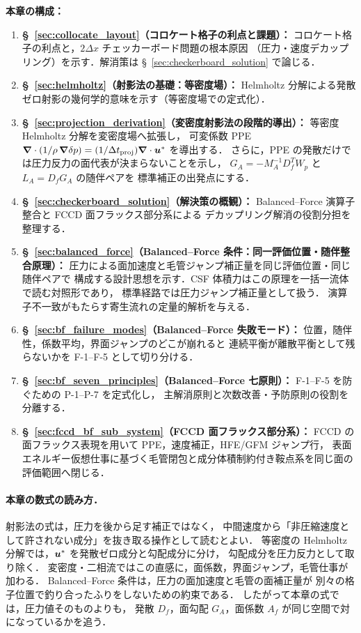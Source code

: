 \noindent\textbf{本章の構成：}
\begin{enumerate}
  \item \textbf{§~\ref{sec:collocate_layout}（コロケート格子の利点と課題）：}
        コロケート格子の利点と，$2\Delta x$ チェッカーボード問題の根本原因
        （圧力・速度デカップリング）を示す．解消策は §~\ref{sec:checkerboard_solution} で論じる．
  \item \textbf{§~\ref{sec:helmholtz}（射影法の基礎：等密度場）：}
        Helmholtz 分解による発散ゼロ射影の幾何学的意味を示す（等密度場での定式化）．
  \item \textbf{§~\ref{sec:projection_derivation}（変密度射影法の段階的導出）：}
        等密度 Helmholtz 分解を変密度場へ拡張し，
        可変係数 PPE
        $\bm{\nabla}\cdot(1/\rho\,\bm{\nabla}\delta p)
        = (1/\Delta t_{\mathrm{proj}})\bm{\nabla}\cdot\bm{u}^*$ を導出する．
        さらに，PPE の発散だけでは圧力反力の面代表が決まらないことを示し，
        $G_A=-M_A^{-1}D_f^TW_p$ と $L_A=D_fG_A$ の随伴ペアを
        標準補正の出発点にする．
  \item \textbf{§~\ref{sec:checkerboard_solution}（解決策の概観）：}
        Balanced--Force 演算子整合と FCCD 面フラックス部分系による
        デカップリング解消の役割分担を整理する．
  \item \textbf{§~\ref{sec:balanced_force}（Balanced--Force 条件：同一評価位置・随伴整合原理）：}
        圧力による面加速度と毛管ジャンプ補正量を同じ評価位置・同じ随伴ペアで
        構成する設計思想を示す．CSF 体積力はこの原理を一括一流体で読む対照形であり，
        標準経路では圧力ジャンプ補正量として扱う．
        演算子不一致がもたらす寄生流れの定量的解析を与える．
  \item \textbf{§~\ref{sec:bf_failure_modes}（Balanced--Force 失敗モード）：}
        位置，随伴性，係数平均，界面ジャンプのどこが崩れると
        連続平衡が離散平衡として残らないかを F-1--F-5 として切り分ける．
  \item \textbf{§~\ref{sec:bf_seven_principles}（Balanced--Force 七原則）：}
        F-1--F-5 を防ぐための P-1--P-7 を定式化し，
        主解消原則と次数改善・予防原則の役割を分離する．
  \item \textbf{§~\ref{sec:fccd_bf_sub_system}（FCCD 面フラックス部分系）：}
        FCCD の面フラックス表現を用いて PPE，速度補正，HFE/GFM ジャンプ行，
        表面エネルギー仮想仕事に基づく毛管閉包と成分体積制約付き鞍点系を同じ面の評価範囲へ閉じる．
\end{enumerate}

\paragraph{本章の数式の読み方．}
射影法の式は，圧力を後から足す補正ではなく，
中間速度から「非圧縮速度として許されない成分」を抜き取る操作として読むとよい．
等密度の Helmholtz 分解では，$\bm{u}^*$ を発散ゼロ成分と勾配成分に分け，
勾配成分を圧力反力として取り除く．
変密度・二相流ではこの直感に，面係数，界面ジャンプ，毛管仕事が加わる．
Balanced--Force 条件は，圧力の面加速度と毛管の面補正量が
別々の格子位置で釣り合ったふりをしないための約束である．
したがって本章の式では，圧力値そのものよりも，
発散 $D_f$，面勾配 $G_A$，面係数 $A_f$ が同じ空間で対になっているかを追う．

